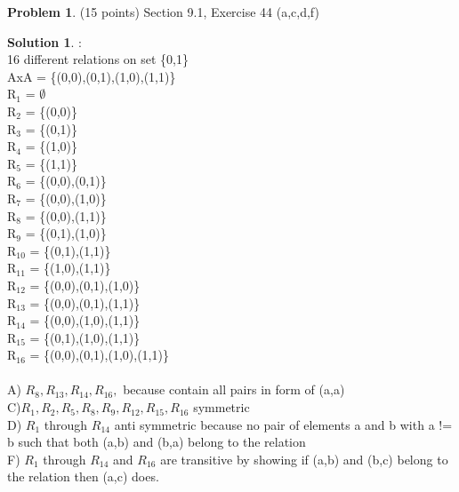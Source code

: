 \documentclass{article}
\theoremstyle{definition}
\newtheorem{problem}{Problem}
\newtheorem*{solution}{Solution}
\begin{document}
\begin{problem} (15 points) Section 9.1, Exercise 44 (a,c,d,f)
\end{problem}
\begin{solution} :
\\
16 different relations on set \{0,1\}
\\
AxA = \{(0,0),(0,1),(1,0),(1,1)\}
\\

R$_1$ = $\emptyset$
\\
R$_2$ = \{(0,0)\}\\
R$_3$ = \{(0,1)\}\\
R$_4$ = \{(1,0)\}\\
R$_5$ = \{(1,1)\}\\
R$_6$ = \{(0,0),(0,1)\}\\
R$_7$ = \{(0,0),(1,0)\}\\
R$_8$ = \{(0,0),(1,1)\}\\
R$_9$ = \{(0,1),(1,0)\}\\
R$_{10}$ = \{(0,1),(1,1)\}\\
R$_{11}$ = \{(1,0),(1,1)\}\\
R$_{12}$ = \{(0,0),(0,1),(1,0)\}\\
R$_{13}$ = \{(0,0),(0,1),(1,1)\}\\
R$_{14}$ = \{(0,0),(1,0),(1,1)\}\\
R$_{15}$ = \{(0,1),(1,0),(1,1)\}\\
R$_{16}$ = \{(0,0),(0,1),(1,0),(1,1)\}\\
\\

A) $R_8, R_{13}, R_{14}, R_{16},$ because contain all pairs in form of (a,a)\\

C)$R_1, R_2, R_5, R_8, R_9, R_{12}, R_{15}, R_{16}$ symmetric \\

D) $R_1$ through $R_{14}$ anti symmetric because no pair of elements a and b with a != b such that both (a,b) and (b,a) belong to the relation\\

F) $R_1$ through $R_{14}$ and $R_{16}$ are transitive by showing if (a,b) and (b,c) belong to the relation then (a,c) does.

\end{solution}

\newpage
\end{document}
